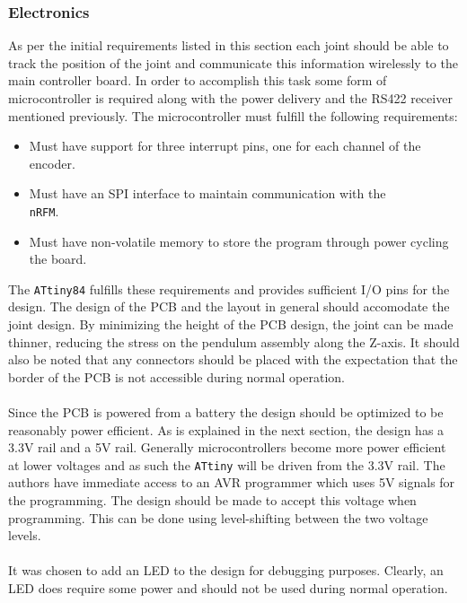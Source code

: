 \subsubsection{Electronics} %
\label{ssub:electronics}
As per the initial requirements listed in this section each joint should be able to track the position of the joint and communicate this information wirelessly to the main controller board.
In order to accomplish this task some form of microcontroller is required along with the power delivery and the RS422 receiver mentioned previously.
The microcontroller must fulfill the following requirements:
\begin{itemize}
 	\item Must have support for three interrupt pins, one for each channel of the encoder.
 	\item Must have an SPI interface to maintain communication with the\\ \texttt{nRFM}.
 	\item Must have non-volatile memory to store the program through power cycling the board.
\end{itemize}
The \texttt{ATtiny84} \cite{attiny84} fulfills these requirements and provides sufficient I/O pins for the design.
The design of the PCB and the layout in general should accomodate the joint design.
By minimizing the height of the PCB design, the joint can be made thinner, reducing the stress on the pendulum assembly along the Z-axis.
It should also be noted that any connectors should be placed with the expectation that the border of the PCB is not accessible during normal operation.
\\~\\
Since the PCB is powered from a battery the design should be optimized to be reasonably power efficient.
As is explained in the next section, the design has a 3.3V rail and a 5V rail.
Generally microcontrollers become more power efficient at lower voltages and as such the \texttt{ATtiny} will be driven from the 3.3V rail.
The authors have immediate access to an AVR programmer which uses 5V signals for the programming.
The design should be made to accept this voltage when programming.
This can be done using level-shifting between the two voltage levels.
\\~\\
It was chosen to add an LED to the design for debugging purposes.
Clearly, an LED does require some power and should not be used during normal operation.

